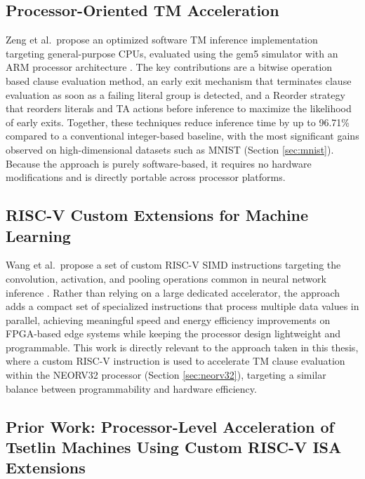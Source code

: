 \subsection{Processor-Oriented TM Acceleration}
\label{sec:related_processor}

Zeng et al.\ propose an optimized software TM inference implementation targeting general-purpose CPUs, evaluated using the gem5 simulator with an ARM processor architecture \cite{zeng2025fastcompacttsetlinmachine}. The key contributions are a bitwise operation based clause evaluation method, an early exit mechanism that terminates clause evaluation as soon as a failing literal group is detected, and a Reorder strategy that reorders literals and TA actions before inference to maximize the likelihood of early exits. Together, these techniques reduce inference time by up to 96.71\% compared to a conventional integer-based baseline, with the most significant gains observed on high-dimensional datasets such as MNIST (Section \ref{sec:mnist}). Because the approach is purely software-based, it requires no hardware modifications and is directly portable across processor platforms.

\subsection{RISC-V Custom Extensions for Machine Learning}
\label{sec:related_riscv}

Wang et al.\ propose a set of custom RISC-V SIMD instructions targeting the convolution, activation, and pooling operations common in neural network inference \cite{WangShihang2024OCCU}. Rather than relying on a large dedicated accelerator, the approach adds a compact set of specialized instructions that process multiple data values in parallel, achieving meaningful speed and energy efficiency improvements on FPGA-based edge systems while keeping the processor design lightweight and programmable. This work is directly relevant to the approach taken in this thesis, where a custom RISC-V instruction is used to accelerate TM clause evaluation within the NEORV32 processor (Section \ref{sec:neorv32}), targeting a similar balance between programmability and hardware efficiency.

\subsection{Prior Work: Processor-Level Acceleration of Tsetlin Machines
Using Custom RISC-V ISA Extensions}
\label{sec:related_prior}

